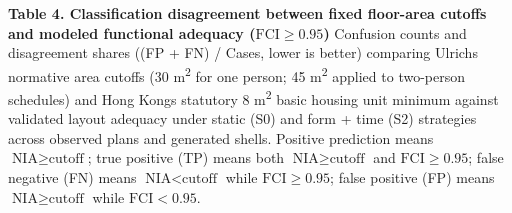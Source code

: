 \documentclass[12pt,letterpaper]{article}
\newcommand{\SubmissionCite}[1]{\unskip\citep{#1}}
\begin{document}
\begin{landscape}
\textbf{Table 4. Classification disagreement between fixed floor-area cutoffs and modeled functional adequacy (\(\text{FCI} \ge 0.95\))} Confusion counts and disagreement shares ((FP + FN) / Cases, lower is better) comparing Ulrich\textquotesingle s \SubmissionCite{ulrich2025minimum} normative area cutoffs (30 m\textsuperscript{2} for one person; 45 m\textsuperscript{2} applied to two-person schedules) and Hong Kong\textquotesingle s statutory 8 m\textsuperscript{2} basic housing unit minimum against validated layout adequacy under static (S0) and form + time (S2) strategies across observed plans and generated shells. Positive prediction means \(\text{NIA} \ge \text{cutoff}\); true positive (TP) means both \(\text{NIA} \ge \text{cutoff}\) and \(\text{FCI} \ge 0.95\); false negative (FN) means \(\text{NIA} < \text{cutoff}\) while \(\text{FCI} \ge 0.95\); false positive (FP) means \(\text{NIA} \ge \text{cutoff}\) while \(\text{FCI} < 0.95\).


\end{landscape}
\end{document}
